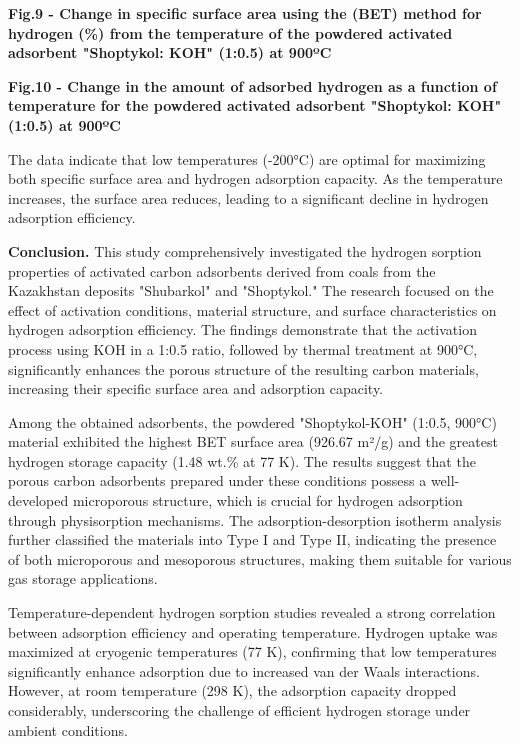 {\bfseries Fig.9 - Change in specific surface area using the (BET) method for hydrogen (\%) from the temperature of the powdered activated adsorbent "Shoptykol: KOH" (1:0.5) at 900ºC}

{\bfseries Fig.10 - Change in the amount of adsorbed hydrogen as a function of temperature for the powdered activated adsorbent "Shoptykol: KOH" (1:0.5) at 900ºC}

\begin{multicols}{2}
The data indicate that low temperatures (-200°C) are optimal for
maximizing both specific surface area and hydrogen adsorption capacity.
As the temperature increases, the surface area reduces, leading to a
significant decline in hydrogen adsorption efficiency.

{\bfseries Conclusion.} This study comprehensively investigated the
hydrogen sorption properties of activated carbon adsorbents derived from
coals from the Kazakhstan deposits "Shubarkol" and "Shoptykol." The
research focused on the effect of activation conditions, material
structure, and surface characteristics on hydrogen adsorption
efficiency. The findings demonstrate that the activation process using
KOH in a 1:0.5 ratio, followed by thermal treatment at 900°C,
significantly enhances the porous structure of the resulting carbon
materials, increasing their specific surface area and adsorption
capacity.

Among the obtained adsorbents, the powdered "Shoptykol-KOH" (1:0.5,
900°C) material exhibited the highest BET surface area (926.67 m²/g) and
the greatest hydrogen storage capacity (1.48 wt.\% at 77 K). The results
suggest that the porous carbon adsorbents prepared under these
conditions possess a well-developed microporous structure, which is
crucial for hydrogen adsorption through physisorption mechanisms. The
adsorption-desorption isotherm analysis further classified the materials
into Type I and Type II, indicating the presence of both microporous and
mesoporous structures, making them suitable for various gas storage
applications.

Temperature-dependent hydrogen sorption studies revealed a strong
correlation between adsorption efficiency and operating temperature.
Hydrogen uptake was maximized at cryogenic temperatures (77 K),
confirming that low temperatures significantly enhance adsorption due to
increased van der Waals interactions. However, at room temperature (298
K), the adsorption capacity dropped considerably, underscoring the
challenge of efficient hydrogen storage under ambient conditions.


\end{multicols}
